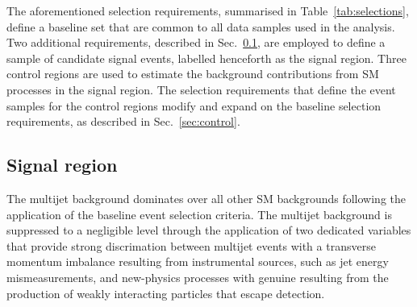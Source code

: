 The aforementioned selection requirements, summarised in
Table~\ref{tab:selections}, define a baseline set that are common to
all data samples used in the analysis. Two additional requirements,
described in Sec.~\ref{sec:signal}, are employed to define a
sample of candidate signal events, labelled henceforth as the signal
region. Three control regions are used to estimate the background
contributions from SM processes in the signal region. The selection
requirements that define the event samples for the control regions
modify and expand on the baseline selection requirements, as described
in Sec.~\ref{sec:control}. 


\subsection{Signal region}
\label{sec:signal}

The multijet background dominates over all other SM backgrounds
following the application of the baseline event selection
criteria. The multijet background is suppressed to a negligible level
through the application of two dedicated variables that provide strong
discrimation between multijet events with a transverse momentum
imbalance resulting from instrumental sources, such as jet energy
mismeasurements, and new-physics processes with genuine \ptvecmiss
resulting from the production of weakly interacting particles that
escape detection.

